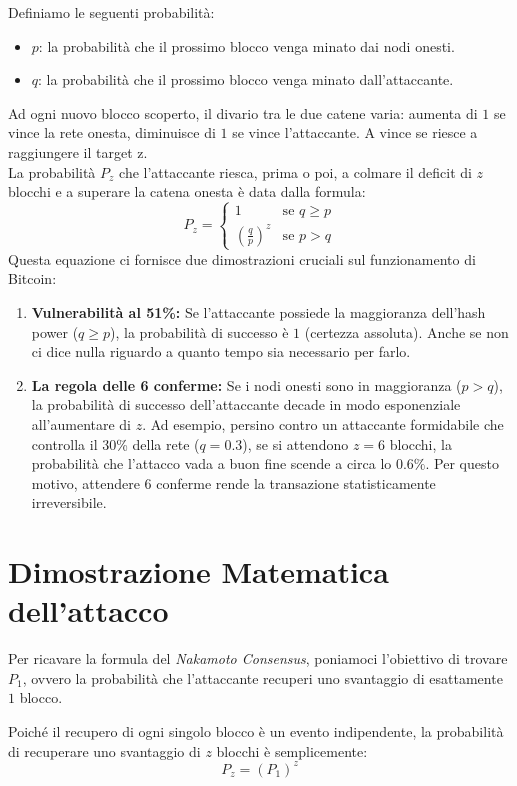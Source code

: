Definiamo le seguenti probabilità:
\begin{itemize}
    \item $p$: la probabilità che il prossimo blocco venga minato dai nodi onesti.
    \item $q$: la probabilità che il prossimo blocco venga minato dall'attaccante.
\end{itemize}
Ad ogni nuovo blocco scoperto, il divario tra le due catene varia: aumenta di $1$ se vince la rete onesta, diminuisce di $1$ se vince l'attaccante. A vince se riesce a raggiungere il target z. \\
La probabilità $P_z$ che l'attaccante riesca, prima o poi, a colmare il deficit di $z$ blocchi e a superare la catena onesta è data dalla formula:
\[
P_z = 
\begin{cases} 
1 & \text{se } q \ge p \\
\left(\frac{q}{p}\right)^z & \text{se } p > q 
\end{cases}\]
Questa equazione ci fornisce due dimostrazioni cruciali sul funzionamento di Bitcoin:
\begin{enumerate}
    \item \textbf{Vulnerabilità al 51\%:} Se l'attaccante possiede la maggioranza dell'hash power ($q \ge p$), la probabilità di successo è $1$ (certezza assoluta). Anche se non ci dice nulla riguardo a quanto tempo sia necessario per farlo.
    \item \textbf{La regola delle 6 conferme:} Se i nodi onesti sono in maggioranza ($p > q$), la probabilità di successo dell'attaccante decade in modo esponenziale all'aumentare di $z$. Ad esempio, persino contro un attaccante formidabile che controlla il 30\% della rete ($q = 0.3$), se si attendono $z = 6$ blocchi, la probabilità che l'attacco vada a buon fine scende a circa lo $0.6\%$. Per questo motivo, attendere 6 conferme rende la transazione statisticamente irreversibile.
\end{enumerate}
\section{Dimostrazione Matematica dell'attacco}

Per ricavare la formula del \textit{Nakamoto Consensus}, poniamoci l'obiettivo di trovare $P_1$, ovvero la probabilità che l'attaccante recuperi uno svantaggio di esattamente $1$ blocco.

Poiché il recupero di ogni singolo blocco è un evento indipendente, la probabilità di recuperare uno svantaggio di $z$ blocchi è semplicemente:
$$P_z = (P_1)^z$$

